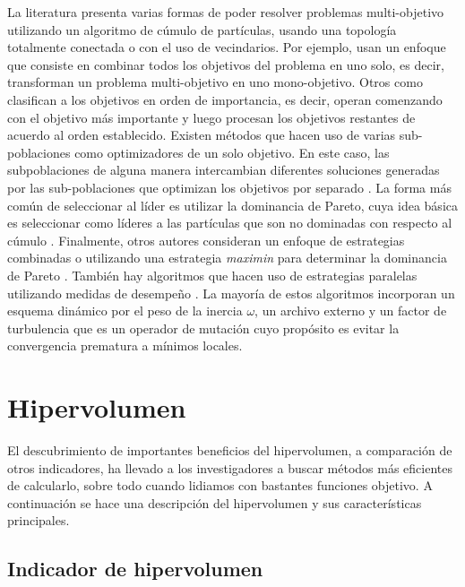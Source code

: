   La literatura presenta varias formas de poder resolver problemas multi-objetivo utilizando un algoritmo de c\'umulo de part\'iculas, 
  usando una topolog\'ia totalmente conectada o con el uso de vecindarios. Por ejemplo, \cite{Parsopoulos02particleswarm} usan un enfoque
  que consiste en combinar todos los objetivos del problema en uno solo, es decir, transforman un problema multi-objetivo en uno mono-objetivo. 
  Otros
  como \cite{Hu02multiobjectiveoptimization, Hu03particleswarm} clasifican a los objetivos en orden de importancia, es decir, operan 
  comenzando con el objetivo m\'as importante y luego procesan los objetivos restantes de acuerdo al orden establecido. 
  Existen m\'etodos que hacen uso de varias sub-poblaciones como optimizadores de un solo objetivo. En este caso, las subpoblaciones 
  de alguna 
  manera intercambian diferentes soluciones generadas por las sub-poblaciones que optimizan los objetivos por separado \cite{Mostaghim04coveringpareto-optimal, MartinezC11}.
  La forma m\'as com\'un de seleccionar al l\'ider es utilizar la dominancia de Pareto, cuya idea b\'asica es seleccionar como 
  l\'ideres a las part\'iculas que son no dominadas con respecto al c\'umulo \cite{Coello04, Salazar05a}. Finalmente, otros 
  autores consideran un enfoque de estrategias combinadas o utilizando una estrategia \textit{maximin} para determinar la dominancia de Pareto 
  \cite{Mostaghim7, FuJZ11}. Tambi\'en hay algoritmos que hacen uso de estrategias paralelas utilizando medidas de desempe\~no \cite{Parallel}. 
  La mayor\'ia de estos algoritmos incorporan un esquema din\'amico por el peso de la inercia $\omega$, un archivo externo y un 
  factor de turbulencia que es un operador de mutaci\'on cuyo prop\'osito es evitar la convergencia prematura a m\'inimos locales.
  
\section{Hipervolumen}

   El descubrimiento de importantes beneficios del hipervolumen, a comparaci\'on de otros indicadores, ha llevado a los investigadores
   a buscar m\'etodos m\'as eficientes de calcularlo, sobre todo cuando lidiamos con bastantes funciones objetivo.
   A continuaci\'on se hace una descripci\'on del hipervolumen y sus caracter\'isticas principales.

  \subsection{Indicador de hipervolumen}
  
